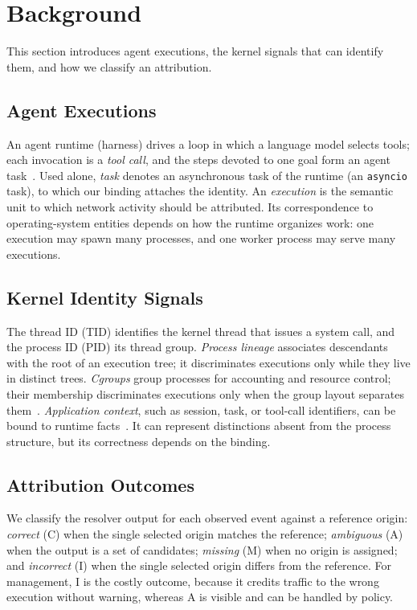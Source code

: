 \section{Background}
\label{sec:background}

This section introduces agent executions, the kernel signals that can identify them, and how we classify an attribution.

\subsection{Agent Executions}
An agent runtime (harness) drives a loop in which a language model selects tools; each invocation is a \emph{tool call}, and the steps devoted to one goal form an agent task~\cite{yao2023react}. Used alone, \emph{task} denotes an asynchronous task of the runtime (\eg an \texttt{asyncio} task), to which our binding attaches the identity. An \emph{execution} is the semantic unit to which network activity should be attributed. Its correspondence to operating-system entities depends on how the runtime organizes work: one execution may spawn many processes, and one worker process may serve many executions.

\subsection{Kernel Identity Signals}
The thread ID (TID) identifies the kernel thread that issues a system call, and the process ID (PID) its thread group. \emph{Process lineage} associates descendants with the root of an execution tree; it discriminates executions only while they live in distinct trees. \emph{Cgroups} group processes for accounting and resource control; their membership discriminates executions only when the group layout separates them~\cite{zheng2026agentcgroup}. \emph{Application context}, such as session, task, or tool-call identifiers, can be bound to runtime facts~\cite{byteyellow2026agentprovenance,otel2026genai}. It can represent distinctions absent from the process structure, but its correctness depends on the binding.

\subsection{Attribution Outcomes}
We classify the resolver output for each observed event against a reference origin: \emph{correct} (C) when the single selected origin matches the reference; \emph{ambiguous} (A) when the output is a set of candidates; \emph{missing} (M) when no origin is assigned; and \emph{incorrect} (I) when the single selected origin differs from the reference. For management, I is the costly outcome, because it credits traffic to the wrong execution without warning, whereas A is visible and can be handled by policy.
